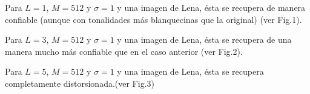 \documentclass[10pt,journal,compsoc]{IEEEtran}
\begin{document}
Para $L = {1}$, $M = {512}$ y $\sigma = 1$ y una imagen de Lena, \'esta se recupera de manera confiable (aunque con tonalidades m\'as blanquecinas que la original) (ver Fig.1). 

Para $L = {3}$, $M = {512}$ y $\sigma = 1$ y una imagen de Lena, \'esta se recupera de una manera mucho m\'as confiable que en el caso anterior (ver Fig.2).

Para $L = {5}$, $M = {512}$ y $\sigma = 1$ y una imagen de Lena, \'esta se recupera completamente distorsionada.(ver Fig.3)\\

\begin{figure}
\begin{center}
\label{fig:refuerzos2}
\centering
\begin{minipage}{.5\textwidth}
  \centering


\end{minipage}
\end{center}
\end{figure}
\end{document}
